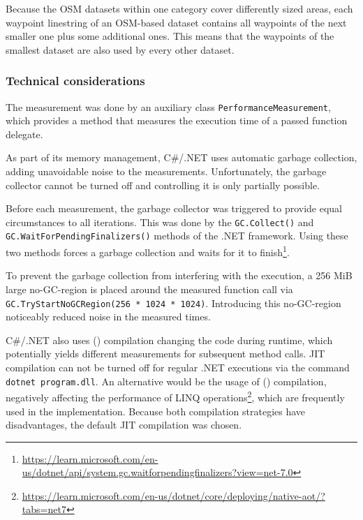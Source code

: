 			Because the OSM datasets within one category cover differently sized areas, each waypoint linestring of an OSM-based dataset contains all waypoints of the next smaller one plus some additional ones.
			This means that the waypoints of the smallest dataset are also used by every other dataset.
		
		\subsubsection{Technical considerations}
		
			The measurement was done by an auxiliary class \texttt{PerformanceMeasurement}, which provides a method that measures the execution time of a passed function delegate.
			
			As part of its memory management, C\#/.NET uses automatic garbage collection, adding unavoidable noise to the measurements.
			Unfortunately, the garbage collector cannot be turned off and controlling it is only partially possible.
			
			Before each measurement, the garbage collector was triggered to provide equal circumstances to all iterations.
			This was done by the \texttt{GC.Collect()} and \texttt{GC.WaitForPendingFinalizers()} methods of the .NET framework.
			Using these two methods forces a garbage collection and waits for it to finish\footnote{\url{https://learn.microsoft.com/en-us/dotnet/api/system.gc.waitforpendingfinalizers?view=net-7.0}}.
			
			To prevent the garbage collection from interfering with the execution, a 256 MiB large no-GC-region is placed around the measured function call via \texttt{GC.TryStartNoGCRegion(256 * 1024 * 1024)}.
			Introducing this no-GC-region noticeably reduced noise in the measured times.
		
			C\#/.NET also uses  () compilation changing the code during runtime, which potentially yields different measurements for subsequent method calls.
			JIT compilation can not be turned off for regular .NET executions via the command \texttt{dotnet program.dll}.
			An alternative would be the usage of  () compilation, negatively affecting the performance of LINQ operations\footnote{\url{https://learn.microsoft.com/en-us/dotnet/core/deploying/native-aot/?tabs=net7}}, which are frequently used in the implementation.
			Because both compilation strategies have disadvantages, the default JIT compilation was chosen.
			

